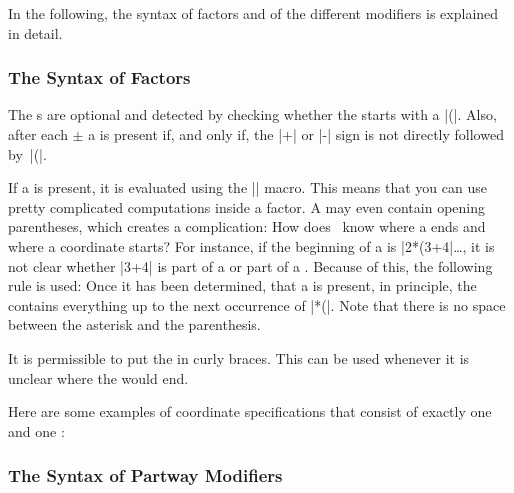 In the following, the syntax of factors and of the different modifiers
is explained in detail.


\subsubsection{The Syntax of Factors}

The s are optional and detected by checking whether the
 starts with a |(|. Also, after each $\pm$ a
 is present if, and only if, the |+| or |-| sign is not directly
followed by~|(|.

If a  is present, it is evaluated using the |\pgfmathparse| macro.
This means that you can use pretty complicated computations inside a factor. A
 may even contain opening parentheses, which creates a
complication: How does \tikzname\ know where a  ends and where a
coordinate starts? For instance, if the beginning of a  is |2*(3+4|\dots, it is not clear whether |3+4| is part of a
 or part of a . Because of this, the following
rule is used: Once it has been determined, that a  is present, in
principle, the  contains everything up to the next occurrence of
|*(|. Note that there is no space between the asterisk and the parenthesis.

It is permissible to put the  in curly braces. This can be used
whenever it is unclear where the  would end.

Here are some examples of coordinate specifications that consist of exactly one
 and one :
%
\begin{codeexample}[]
\end{codeexample}


\subsubsection{The Syntax of Partway Modifiers}

